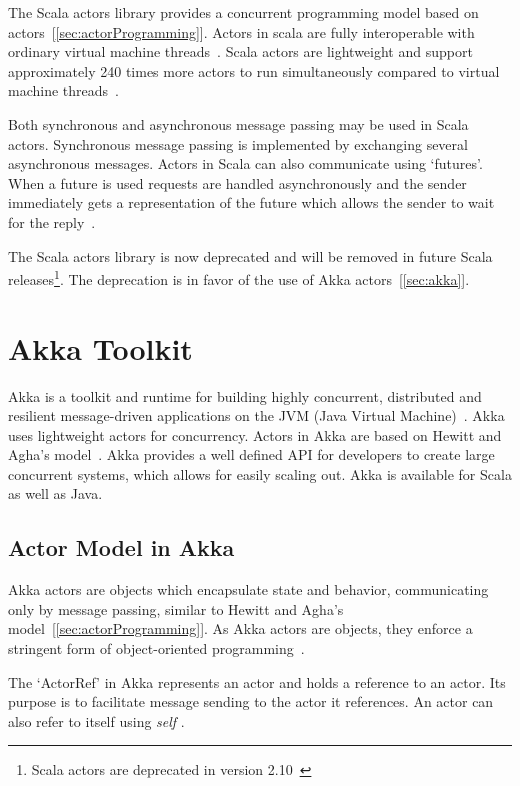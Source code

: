   The Scala actors library provides a concurrent programming model based on actors~[\autoref{sec:actorProgramming}]. Actors in scala are fully interoperable with ordinary virtual machine threads~\cite{Haller}. Scala actors are lightweight and support approximately 240 times more actors to run simultaneously compared to virtual machine threads~\cite{Haller}.

  Both synchronous and asynchronous message passing may be used in Scala actors. Synchronous message passing is implemented by exchanging several asynchronous messages. Actors in Scala can also communicate using ‘futures’. When a future is used requests are handled asynchronously and the sender immediately gets a representation of the future which allows the sender to wait for the reply~\cite{scalaActors}.

  The Scala actors library is now deprecated and will be removed in future Scala releases\footnote{Scala actors are deprecated in version 2.10~\cite{scalaActorsAPI}}. The deprecation is in favor of the use of Akka actors~[\autoref{sec:akka}].

\section{Akka Toolkit}
\label{sec:akka}
Akka is a toolkit and runtime for building highly concurrent, distributed and resilient message-driven applications on the JVM (Java Virtual Machine)~\cite{akkaHome}. Akka uses lightweight actors for concurrency. Actors in Akka are based on Hewitt and Agha's model~\cite{agha, hewitt}. Akka provides a well defined API for developers to create large concurrent systems, which allows for easily scaling out.
  Akka is available for Scala as well as Java.

  \subsection{Actor Model in Akka}
  Akka actors are objects which encapsulate state and behavior,  communicating only by message passing, similar to Hewitt and Agha's model~[\autoref{sec:actorProgramming}]. As Akka actors are objects, they enforce a stringent form of object-oriented programming~\cite{akkaActorSystem}.

  The ‘ActorRef’ in Akka represents an actor and holds a reference to an actor. Its purpose is to facilitate message sending to the actor it references. An actor can also refer to itself using \emph{self} \cite{akkaJavaDoc}.

